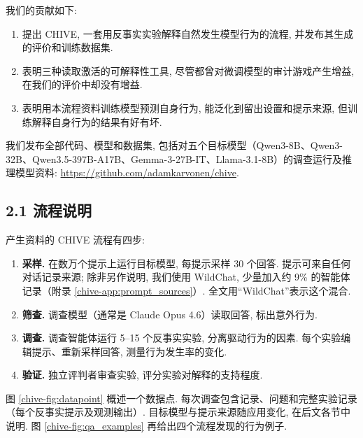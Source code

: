 我们的贡献如下:
\begin{enumerate}
\item 提出 CHIVE, 一套用反事实实验解释自然发生模型行为的流程, 并发布其生成的评价和训练数据集.
\item 表明三种读取激活的可解释性工具, 尽管都曾对微调模型的审计游戏产生增益, 在我们的评价中却没有增益.
\item 表明用本流程资料训练模型预测自身行为, 能泛化到留出设置和提示来源, 但训练解释自身行为的结果有好有坏.
\end{enumerate}
我们发布全部代码、模型和数据集, 包括对五个目标模型（Qwen3-8B、Qwen3-32B、Qwen3.5-397B-A17B、Gemma-3-27B-IT、Llama-3.1-8B）的调查运行及推理模型资料: \url{https://github.com/adamkarvonen/chive}.

\subsection*{2.1 流程说明}
产生资料的 CHIVE 流程有四步:
\begin{enumerate}
\item \textbf{采样.} 在数万个提示上运行目标模型, 每提示采样 30 个回答. 提示可来自任何对话记录来源; 除非另作说明, 我们使用 WildChat\cite{chive-zhao2024wildchat1mchatgptinteraction}, 少量加入约 9\% 的智能体记录（附录 \ref{chive-app:prompt_sources}）. 全文用“WildChat”表示这个混合.
\item \textbf{筛查.} 调查模型（通常是 Claude Opus 4.6）读取回答, 标出意外行为.
\item \textbf{调查.} 调查智能体运行 5--15 个反事实实验, 分离驱动行为的因素. 每个实验编辑提示、重新采样回答, 测量行为发生率的变化.
\item \textbf{验证.} 独立评判者审查实验, 评分实验对解释的支持程度.
\end{enumerate}
图 \ref{chive-fig:datapoint} 概述一个数据点. 每次调查包含记录、问题和完整实验记录（每个反事实提示及观测输出）. 目标模型与提示来源随应用变化, 在后文各节中说明. 图 \ref{chive-fig:qa_examples} 再给出四个流程发现的行为例子.

